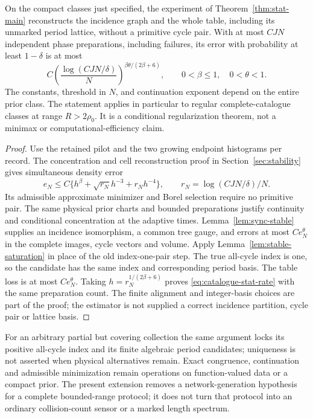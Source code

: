 \begin{theorem}
\label{thm:catalogue-stability}
On the compact classes just specified, the experiment of
Theorem~\ref{thm:stat-main} reconstructs the incidence graph and the
whole table, including its unmarked period lattice, without a primitive
cycle pair. With at most $CJN$ independent phase preparations, including
failures, its error with probability at least $1-\delta$ is at most
\begin{equation}\label{eq:catalogue-stat-rate}
 C\left(\frac{\log(CJN/\delta)}{N}\right)^{\beta\theta/(2\beta+6)},
       \qquad 0<\beta\le1,\quad 0<\theta<1.
\end{equation}
The constants, threshold in $N$, and continuation exponent depend on the
entire prior class. The statement applies in particular to regular
complete-catalogue classes at range $R>2\rho_0$. It is a conditional
regularization theorem, not a minimax or computational-efficiency claim.
\end{theorem}
\begin{proof}
Use the retained pilot and the two growing endpoint histograms per
record. The concentration and cell reconstruction proof in
Section~\ref{sec:stability} gives simultaneous density error
\[
 e_N\le C\{h^\beta+\sqrt{r_N}h^{-3}+r_Nh^{-4}\},\qquad
 r_N=\log(CJN/\delta)/N.
\]
Its admissible approximate minimizer and Borel selection require no
primitive pair. The same physical prior charts and bounded preparations
justify continuity and conditional concentration at the adaptive times.
Lemma~\ref{lem:sync-stable} supplies an incidence isomorphism, a common
tree gauge, and errors at most $Ce_N^\theta$ in the complete images,
cycle vectors and volume. Apply Lemma~\ref{lem:stable-saturation} in
place of the old index-one-pair step. The true all-cycle index is one,
so the candidate has the same index and corresponding period basis.
The table loss is at most $Ce_N^\theta$. Taking
$h=r_N^{1/(2\beta+6)}$ proves \eqref{eq:catalogue-stat-rate} with the
same preparation count. The finite alignment and integer-basis choices
are part of the proof; the estimator is not supplied a correct incidence
partition, cycle pair or lattice basis.
\end{proof}

For an arbitrary partial but covering collection the same argument locks
its positive all-cycle index and its finite algebraic period candidates;
uniqueness is not asserted when physical alternatives remain. Exact
congruence, continuation and admissible minimization remain operations
on function-valued data or a compact prior. The present extension removes
a network-generation hypothesis for a complete bounded-range protocol;
it does not turn that protocol into an ordinary collision-count sensor
or a marked length spectrum.
